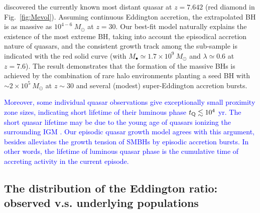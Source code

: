 \documentclass[twocolumn, twocolappendix]{aastex63}
\newcommand{\Msun}{M_\odot}
\newcommand{\red}[1]{\textcolor{red}{ #1}}
\newcommand{\blue}[1]{\textcolor{blue}{ #1}}
\begin{document}
\begin{CJK*}{UTF8}{gbsn}
\citet{2021ApJ...907L...1W} discovered the currently known most distant quasar at $z=7.642$ (red diamond in Fig.~\ref{fig:Mevol}).
Assuming continuous Eddington accretion, the extrapolated BH is as massive as $10^{4-6}~\Msun$ at $z= 30$. 
Our best-fit model naturally explains the existence of the most extreme BH,
taking into account the episodical accretion nature of quasars,
and the consistent growth track among the sub-sample is indicated with the red solid curve 
(with $M_\bullet \simeq 1.7\times 10^9~\Msun$ and $\lambda \simeq 0.6$ at $z=7.6$).
The result demonstrates that the formation of the massive BHs is achieved by the combination of rare halo environments planting a seed BH 
with $\sim 2\times 10^5~\Msun$ at $z\sim 30$ and several (modest) super-Eddington accretion bursts.


\blue{
Moreover, some individual quasar observations give exceptionally small proximity zone sizes,
indicating short lifetime of their luminous phase $t_{\rm Q} \lesssim 10^4$ yr.
The short quasar lifetime may be due to the young age of quasars ionizing the surrounding IGM \citep[e.g.,][]{2020ApJ...903...60I,2021ApJ...917...38E}.
Our episodic quasar growth model agrees with this argument,
besides alleviates the growth tension of SMBHs by episodic accretion bursts.
In other words, the lifetime of luminous quasar phase is the cumulative time of accreting activity in the current episode.
}



\vspace{2mm}
\subsection{The distribution of the Eddington ratio: \\observed v.s. underlying populations}\label{sec:ldist}


\end{CJK*}
\end{document}
